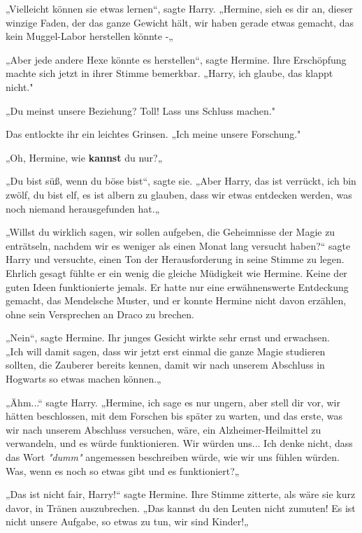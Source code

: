 {„Vielleicht können sie etwas lernen“, sagte Harry. „Hermine, sieh es dir an, dieser winzige Faden, der das ganze Gewicht hält, wir haben gerade etwas gemacht, das kein Muggel-Labor herstellen könnte -„

„Aber jede andere Hexe könnte es herstellen“, sagte Hermine. Ihre Erschöpfung machte sich jetzt in ihrer Stimme bemerkbar. „Harry, ich glaube, das klappt nicht."

„Du meinst unsere Beziehung? Toll! Lass uns Schluss machen."

Das entlockte ihr ein leichtes Grinsen. „Ich meine unsere Forschung."

„Oh, Hermine, wie \textbf{kannst} du nur?„

„Du bist süß, wenn du böse bist“, sagte sie. „Aber Harry, das ist verrückt, ich bin zwölf, du bist elf, es ist albern zu glauben, dass wir etwas entdecken werden, was noch niemand herausgefunden hat.„

„Willst du wirklich sagen, wir sollen aufgeben, die Geheimnisse der Magie zu enträtseln, nachdem wir es weniger als einen Monat lang versucht haben?“ sagte Harry und versuchte, einen Ton der Herausforderung in seine Stimme zu legen. Ehrlich gesagt fühlte er ein wenig die gleiche Müdigkeit wie Hermine. Keine der guten Ideen funktionierte jemals. Er hatte nur eine erwähnenswerte Entdeckung gemacht, das Mendelsche Muster, und er konnte Hermine nicht davon erzählen, ohne sein Versprechen an Draco zu brechen.

„Nein“, sagte Hermine. Ihr junges Gesicht wirkte sehr ernst und erwachsen.\\ „Ich will damit sagen, dass wir jetzt erst einmal die ganze Magie studieren sollten, die Zauberer bereits kennen, damit wir nach unserem Abschluss in Hogwarts so etwas machen können.„

„Ähm...“ sagte Harry. „Hermine, ich sage es nur ungern, aber stell dir vor, wir hätten beschlossen, mit dem Forschen bis später zu warten, und das erste, was wir nach unserem Abschluss versuchen, wäre, ein Alzheimer-Heilmittel zu verwandeln, und es würde funktionieren. Wir würden uns... Ich denke nicht, dass das Wort \emph{"dumm"} angemessen beschreiben würde, wie wir uns fühlen würden.\\ Was, wenn es noch so etwas gibt und es funktioniert?„

„Das ist nicht fair, Harry!“ sagte Hermine. Ihre Stimme zitterte, als wäre sie kurz davor, in Tränen auszubrechen. „Das kannst du den Leuten nicht zumuten! Es ist nicht unsere Aufgabe, so etwas zu tun, wir sind Kinder!„

}
